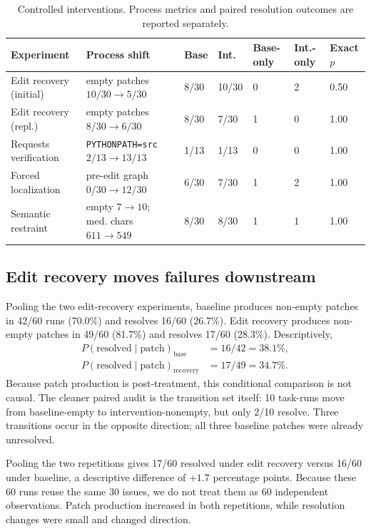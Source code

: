 \documentclass[10pt,twocolumn]{article}
\begin{document}
\begin{table}[t]
\centering
\small
\caption{Controlled interventions. Process metrics and paired resolution outcomes are reported separately.}
\label{tab:main}
\begin{tabular}{lllllll}
\toprule
Experiment & Process shift & Base & Int. & Base-only & Int.-only & Exact $p$ \\
\midrule
Edit recovery (initial) & empty patches $10/30\to5/30$ & 8/30 & 10/30 & 0 & 2 & 0.50 \\
Edit recovery (repl.) & empty patches $8/30\to6/30$ & 8/30 & 7/30 & 1 & 0 & 1.00 \\
Requests verification & \texttt{PYTHONPATH=src} $2/13\to13/13$ & 1/13 & 1/13 & 0 & 0 & 1.00 \\
Forced localization & pre-edit graph $0/30\to12/30$ & 6/30 & 7/30 & 1 & 2 & 1.00 \\
Semantic restraint & empty $7\to10$; med. chars $611\to549$ & 8/30 & 8/30 & 1 & 1 & 1.00 \\
\bottomrule
\end{tabular}
\end{table}

\subsection{Edit recovery moves failures downstream}
Pooling the two edit-recovery experiments, baseline produces non-empty patches in 42/60 runs (70.0\%) and resolves 16/60 (26.7\%). Edit recovery produces non-empty patches in 49/60 (81.7\%) and resolves 17/60 (28.3\%). Descriptively,
\[
\begin{aligned}
P(\mathrm{resolved}\mid\mathrm{patch})_{\mathrm{base}} &= 16/42 = 38.1\%,\\
P(\mathrm{resolved}\mid\mathrm{patch})_{\mathrm{recovery}} &= 17/49 = 34.7\%.
\end{aligned}
\]
Because patch production is post-treatment, this conditional comparison is not causal. The cleaner paired audit is the transition set itself: 10 task-runs move from baseline-empty to intervention-nonempty, but only 2/10 resolve. Three transitions occur in the opposite direction; all three baseline patches were already unresolved.

Pooling the two repetitions gives 17/60 resolved under edit recovery versus 16/60 under baseline, a descriptive difference of $+1.7$ percentage points. Because these 60 runs reuse the same 30 issues, we do not treat them as 60 independent observations. Patch production increased in both repetitions, while resolution changes were small and changed direction.
\end{document}
